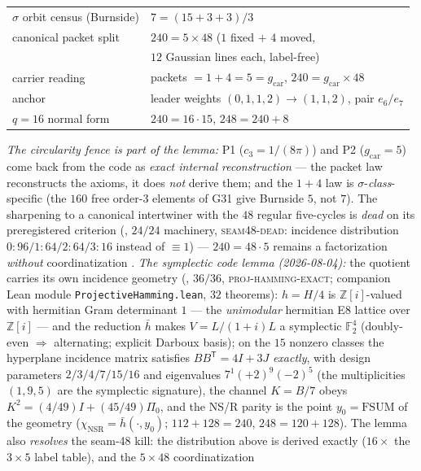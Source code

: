 \documentclass[11pt,a4paper]{article}
\newcommand{\gcar}{g_{\mathrm{car}}}
\newcommand{\cthree}{c_3}
\newcommand{\Z}{\mathbb{Z}}
\theoremstyle{definition}
\begin{document}
\begin{keybox}
\begin{center}
\begin{tabular}{ll}
$\sigma$ orbit census (Burnside) & $7=(15+3+3)/3$ \\
canonical packet split & $240=5\times48$ ($1$ fixed $+$ $4$ moved, \\
 & \quad $12$ Gaussian lines each, label-free) \\
carrier reading & packets $=1+4=5=\gcar$, $240=\gcar\times48$ \\
anchor & leader weights $(0,1,1,2)\to(1,1,2)$, pair $e_6/e_7$ \\
$q=16$ normal form & $240=16\cdot15$, \quad $248=240+8$ \\
\end{tabular}
\end{center}
\emph{The circularity fence is part of the lemma:} P1
($\cthree=1/(8\pi)$) and P2 ($\gcar=5$) come back from the code as
\emph{exact internal reconstruction} --- the packet law reconstructs
the axioms, it does \emph{not} derive them; and the $1+4$ law is
$\sigma$-\emph{class}-specific (the $160$ free order-$3$ elements of
G31 give Burnside $5$, not $7$).  The sharpening to a canonical
intertwiner with the $48$ regular five-cycles is \emph{dead} on its
preregistered criterion (,
$24/24$ machinery, \textsc{seam48-dead}: incidence distribution
$0{:}96/1{:}64/2{:}64/3{:}16$ instead of $\equiv1$) --- $240=48\cdot5$
remains a factorization \emph{without} coordinatization \mE.
\emph{The symplectic code lemma (2026-08-04):} the quotient carries
its own incidence geometry
(, $36/36$,
\textsc{proj-hamming-exact}; companion Lean module
\texttt{ProjectiveHamming.lean}, $32$ theorems): $h=H/4$ is
$\Z[i]$-valued with hermitian Gram determinant $1$ --- the
\emph{unimodular} hermitian E8 lattice over $\Z[i]$ --- and the
reduction $\bar h$ makes $V=L/(1+i)L$ a symplectic
$\mathbb{F}_2^4$ (doubly-even $\Rightarrow$ alternating; explicit
Darboux basis); on the $15$ nonzero classes the hyperplane
incidence matrix satisfies $BB^{\mathsf T}=4I+3J$ \emph{exactly},
with design parameters $2/3/4/7/15/16$ and eigenvalues
$7^1(+2)^9(-2)^5$ (the multiplicities $(1,9,5)$ are the symplectic
signature), the channel $K=B/7$ obeys
$K^2=(4/49)I+(45/49)\Pi_0$, and the NS/R parity is the point
$y_0=\mathrm{FSUM}$ of the geometry
($\chi_{\mathrm{NSR}}=\bar h(\cdot,y_0)$; $112+128=240$,
$248=120+128$).  The lemma also \emph{resolves} the seam-48 kill:
the distribution above is derived exactly ($16\times$ the
$3\times5$ label table), and the $5\times48$ coordinatization

\end{keybox}
\end{document}
